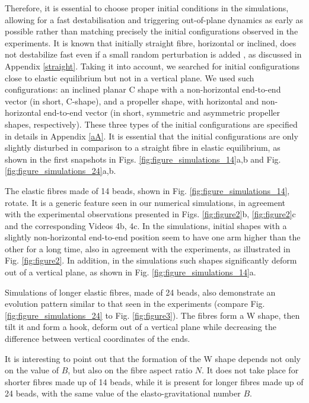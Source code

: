 \documentclass{article}
\begin{document}
Therefore, it is essential to choose proper initial conditions in the simulations, allowing for a fast destabilisation and triggering out-of-plane dynamics as early as possible  rather than matching 
precisely the initial configurations observed in the experiments. It is known that initially straight fibre, horizontal or inclined, does not destabilize fast even if a small random perturbation is added \cite{lagomarsino2005hydrodynamic,saggiorato2015conformations}, as discussed in Appendix \ref{straight}.
Taking it  into account, we searched for initial configurations close to elastic equilibrium but not in a vertical plane. We used such configurations: an inclined planar C shape with a non-horizontal end-to-end vector (in short, C-shape), and a propeller shape, with horizontal and non-horizontal end-to-end vector (in short, symmetric and asymmetric propeller shapes, respectively). These three types of the initial configurations are specified in details in Appendix \ref{aA}. It is essential that the initial configurations are only slightly disturbed in comparison to a straight fibre in elastic equilibrium, as shown in the first snapshots in Figs. \ref{fig:figure_simulations_14}a,b and Fig. \ref{fig:figure_simulations_24}a,b.



The elastic fibres made of 14 beads, shown in Fig. \ref{fig:figure_simulations_14}, %
rotate. It is a generic feature seen in our numerical simulations, in agreement with the experimental observations presented in Figs. \ref{fig:figure2}b, \ref{fig:figure2}c and the corresponding Videos 4b, 4c. In the simulations, initial shapes with a slightly non-horizontal end-to-end position seem to have one arm higher than the other for a long time, also in agreement with the experiments, as illustrated in Fig. \ref{fig:figure2}. In addition, in the simulations such shapes %
significantly deform out of a vertical plane, as shown in Fig. \ref{fig:figure_simulations_14}a. 

Simulations of longer elastic fibres, made of 24 beads, also demonstrate an evolution pattern similar to that seen in the experiments (compare Fig. \ref{fig:figure_simulations_24} to Fig. \ref{fig:figure3}). The fibres form a W shape, then tilt it and form a hook, deform out of a vertical plane while decreasing the difference between vertical coordinates of the ends. 

It is interesting to point out that the formation of the W shape depends not only on the value of $B$\cite{saggiorato2015conformations}, but also on the fibre aspect ratio $N$. It does not take place for shorter fibres made up of 14 beads, while it is present for longer fibres made up of 24 beads, with the same value of the elasto-gravitational number $B$. 
\end{document}

